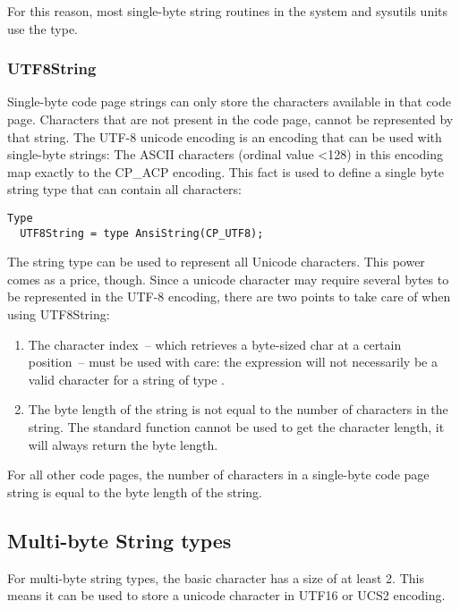For this reason, most single-byte string routines in the system and sysutils units use the  type.

\subsubsection{UTF8String}
Single-byte code page strings can only store the characters available in that code page.
Characters that are not present in the code page, cannot be represented by that string.
The UTF-8 unicode encoding is an encoding that can be used with single-byte strings:
The ASCII characters (ordinal value <128) in this encoding map exactly to the CP_ACP encoding.
This fact is used to define a single byte string type that can contain all characters:
\begin{verbatim}
Type
  UTF8String = type AnsiString(CP_UTF8);
\end{verbatim}
The  string type can be used to represent all Unicode characters. This power comes as a price, though.
Since a unicode character may require several bytes to be represented in the UTF-8 encoding, there are two points to take
care of when using UTF8String:
\begin{enumerate}
\item The character index~-- which retrieves a byte-sized char at a certain position~-- must be used with care: the expression
 will not necessarily be a valid character for a string  of type .
\item The byte length of the string is not equal to the number of characters in the string.
The standard function  cannot be used to get the character length, it will always return the byte length.
\end{enumerate}
For all other code pages, the number of characters in a single-byte code page string is equal to the byte length of the string.


\subsection{Multi-byte String types}
For multi-byte string types, the basic character has a size of at least 2.
This means it can be used to store a unicode character in UTF16 or UCS2 encoding.

